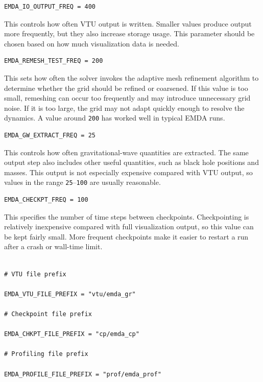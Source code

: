 \begin{verbatim}
EMDA_IO_OUTPUT_FREQ = 400
\end{verbatim}

This controls how often VTU output is written. Smaller values produce output
more frequently, but they also increase storage usage. This parameter should be
chosen based on how much visualization data is needed.

\begin{verbatim}
EMDA_REMESH_TEST_FREQ = 200
\end{verbatim}

This sets how often the solver invokes the adaptive mesh refinement algorithm
to determine whether the grid should be refined or coarsened. If this value is
too small, remeshing can occur too frequently and may introduce unnecessary grid
noise. If it is too large, the grid may not adapt quickly enough to resolve the
dynamics. A value around \texttt{200} has worked well in typical EMDA runs.

\begin{verbatim}
EMDA_GW_EXTRACT_FREQ = 25
\end{verbatim}

This controls how often gravitational-wave quantities are extracted. The same
output step also includes other useful quantities, such as black hole positions
and masses. This output is not especially expensive compared with VTU output,
so values in the range \texttt{25}--\texttt{100} are usually reasonable.

\begin{verbatim}
EMDA_CHECKPT_FREQ = 100
\end{verbatim}

This specifies the number of time steps between checkpoints. Checkpointing is
relatively inexpensive compared with full visualization output, so this value
can be kept fairly small. More frequent checkpoints make it easier to restart a
run after a crash or wall-time limit.

\begin{verbatim}

# VTU file prefix

EMDA_VTU_FILE_PREFIX = "vtu/emda_gr"

# Checkpoint file prefix

EMDA_CHKPT_FILE_PREFIX = "cp/emda_cp"

# Profiling file prefix

EMDA_PROFILE_FILE_PREFIX = "prof/emda_prof"
\end{verbatim}

